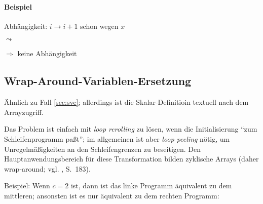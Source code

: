 \paragraph{Beispiel}

\begin{procedure}[H]
\SetAlgoLined
{}
\end{procedure}
Abhängigkeit: $i \rightarrow i+1$ schon wegen $x$

$\leadsto$

\begin{procedure}[H]
\SetAlgoLined
{}
\end{procedure}

$\Rightarrow$ keine Abhängigkeit


\subsection{Wrap-Around-Variablen-Ersetzung}
\label{sec:wave}

Ähnlich zu Fall \ref{sec:sve}; allerdings ist die Skalar-Definitioin
textuell nach dem Arrayzugriff.

Das Problem ist einfach mit \emph{loop rerolling} zu lösen, wenn die
Initialisierung ``zum Schleifenprogramm paßt''; im allgemeinen ist aber
\emph{loop peeling} nötig, um Unregelmäßigkeiten an den Schleifengrenzen
zu beseitigen. Den Hauptanwendungsbereich für diese Transformation
bilden zyklische Arrays (daher wrap-around; vgl. \cite{Zima90}, S.~183).

Beispiel: Wenn $c=2$ ist, dann ist das linke Programm  äquivalent zu dem
mittleren; ansonsten ist es nur äquivalent zu dem rechten Programm:\\

